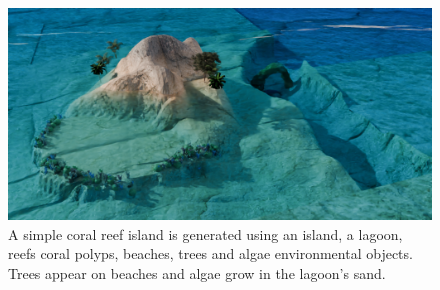 \begin{figure}
    \includegraphics{Figures/CoralIsland/multiScene1 v2 final 1.png}
    \caption{A simple coral reef island is generated using an island, a lagoon, reefs coral polyps, beaches, trees and algae environmental objects. Trees appear on beaches and algae grow in the lagoon's sand. }
    \label{fig:env-obj-coral-island-scene}
\end{figure}
